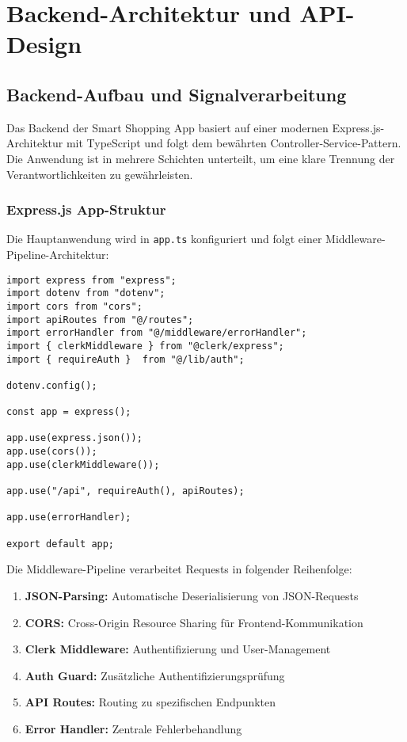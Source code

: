 \chapter{Backend-Architektur und API-Design}
\renewcommand{\authorinitials}{MT}
\label{chap:backend}

\section{Backend-Aufbau und Signalverarbeitung}

Das Backend der Smart Shopping App basiert auf einer modernen Express.js-Architektur mit TypeScript und folgt dem bewährten Controller-Service-Pattern. Die Anwendung ist in mehrere Schichten unterteilt, um eine klare Trennung der Verantwortlichkeiten zu gewährleisten.

\subsection{Express.js App-Struktur}

Die Hauptanwendung wird in \texttt{app.ts} konfiguriert und folgt einer Middleware-Pipeline-Architektur:

\begin{lstlisting}[style=typescriptstyle,caption={Express.js App-Konfiguration}]
import express from "express";
import dotenv from "dotenv";
import cors from "cors";
import apiRoutes from "@/routes";
import errorHandler from "@/middleware/errorHandler";
import { clerkMiddleware } from "@clerk/express";
import { requireAuth }  from "@/lib/auth";

dotenv.config();

const app = express();

app.use(express.json());
app.use(cors());
app.use(clerkMiddleware());

app.use("/api", requireAuth(), apiRoutes);

app.use(errorHandler);

export default app;
\end{lstlisting}

Die Middleware-Pipeline verarbeitet Requests in folgender Reihenfolge:
\begin{enumerate}
    \item \textbf{JSON-Parsing:} Automatische Deserialisierung von JSON-Requests
    \item \textbf{CORS:} Cross-Origin Resource Sharing für Frontend-Kommunikation
    \item \textbf{Clerk Middleware:} Authentifizierung und User-Management
    \item \textbf{Auth Guard:} Zusätzliche Authentifizierungsprüfung
    \item \textbf{API Routes:} Routing zu spezifischen Endpunkten
    \item \textbf{Error Handler:} Zentrale Fehlerbehandlung
\end{enumerate}

